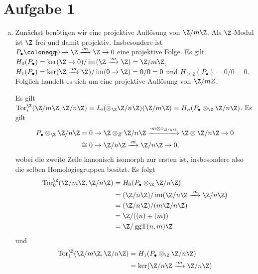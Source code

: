 \documentclass{article}
\newcommand{\im}{\operatorname{im}}
\newcommand{\ggt}{\operatorname{ggT}}
\newcommand{\tor}{\operatorname{Tor}}
\begin{document}
\section*{Aufgabe 1}
\begin{enumerate}[(a)]
    \item Zunächst benötigen wir eine projektive Auflösung von $\Z/m\Z$. Als $\Z$-Modul ist $\Z$ frei und damit projektiv.
          Insbesondere ist $P_\bullet \coloneqq 0 \to \Z \xrightarrow{\cdot m} \Z \to 0$ eine projektive Folge.
          Es gilt $H_0(P_\bullet) = \ker (\Z \to 0) / \im (\Z \xrightarrow{\cdot m} \Z) = \Z/m\Z$,
          $H_1(P_\bullet) = \ker (\Z \xrightarrow{\cdot m} \Z)/\im (0\to \Z) = 0 /0 = 0$ und $H_{\geq 2}(P_\bullet) = 0 /0 = 0$.
          Folglich handelt es sich um eine projektive Auflösung von $\Z/mZ$.

          Es gilt $\tor_i^{\Z}(\Z/m\Z, \Z/n\Z) = L_i(\bar \otimes_\Z \Z/n\Z)(\Z/m\Z) = H_n(P_\bullet \otimes_\Z \Z/n\Z)$.
          Es gilt \begin{align*}
              P_\bullet \otimes_\Z \Z/n\Z & = 0 \to \Z\otimes_Z \Z/n\Z \xrightarrow{\cdot m \otimes 1_{\Z/n\Z}} \Z \otimes \Z/n\Z \to 0 \\
                                          & \cong 0 \to \Z/n\Z \xrightarrow{\cdot m} \Z/n\Z \to 0,
          \end{align*}
          wobei die zweite Zeile kanonisch isomorph zur ersten ist, insbesondere also die selben Homologiegruppen besitzt.
          Es folgt
          \begin{align*}
              \tor_0^{\Z}(\Z/m\Z, \Z/n\Z) & = H_0(P_\bullet \otimes_\Z \Z/n\Z)                   \\
                                          & = (\Z/n\Z)/\im (\Z/n\Z \xrightarrow{\cdot m} \Z/n\Z) \\
                                          & = (\Z/n\Z)/(m\Z/n\Z)                                 \\
                                          & = \Z/((n)+(m))                                       \\
                                          & = \Z/\ggt(n,m)\Z
          \end{align*}
          und
          \begin{align*}
              \tor_1^{\Z}(\Z/m\Z, \Z/n\Z) & = H_1(P_\bullet \otimes_\Z \Z/n\Z)           \\
                                          & = \ker (\Z/n\Z \xrightarrow{\cdot m} \Z/n\Z) \\

\end{align*}
\end{enumerate}
\end{document}
